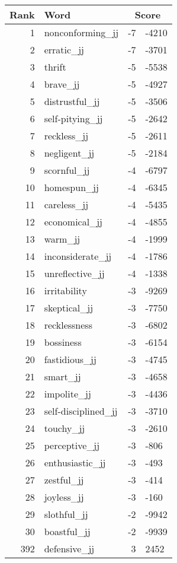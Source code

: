 \begin{longtable}[!htbp]{| rlr@{.}l |}
    \hline
    \textbf{Rank} & \textbf{Word} & \multicolumn{2}{c|}{\textbf{Score}} \\
    \hline
    \endhead
    1 & nonconforming\_jj & -7 & -4210 \\
    2 & erratic\_jj & -7 & -3701 \\
    3 & thrift & -5 & -5538 \\
    4 & brave\_jj & -5 & -4927 \\
    5 & distrustful\_jj & -5 & -3506 \\
    6 & self-pitying\_jj & -5 & -2642 \\
    7 & reckless\_jj & -5 & -2611 \\
    8 & negligent\_jj & -5 & -2184 \\
    9 & scornful\_jj & -4 & -6797 \\
    10 & homespun\_jj & -4 & -6345 \\
    11 & careless\_jj & -4 & -5435 \\
    12 & economical\_jj & -4 & -4855 \\
    13 & warm\_jj & -4 & -1999 \\
    14 & inconsiderate\_jj & -4 & -1786 \\
    15 & unreflective\_jj & -4 & -1338 \\
    16 & irritability & -3 & -9269 \\
    17 & skeptical\_jj & -3 & -7750 \\
    18 & recklessness & -3 & -6802 \\
    19 & bossiness & -3 & -6154 \\
    20 & fastidious\_jj & -3 & -4745 \\
    21 & smart\_jj & -3 & -4658 \\
    22 & impolite\_jj & -3 & -4436 \\
    23 & self-disciplined\_jj & -3 & -3710 \\
    24 & touchy\_jj & -3 & -2610 \\
    25 & perceptive\_jj & -3 & -806 \\
    26 & enthusiastic\_jj & -3 & -493 \\
    27 & zestful\_jj & -3 & -414 \\
    28 & joyless\_jj & -3 & -160 \\
    29 & slothful\_jj & -2 & -9942 \\
    30 & boastful\_jj & -2 & -9939 \\
    392 & defensive\_jj & 3 & 2452 \\

\end{longtable}

